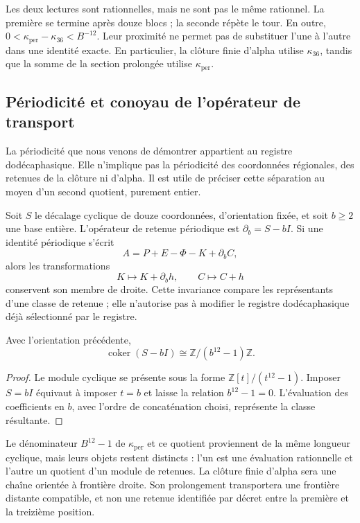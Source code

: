 Les deux lectures sont rationnelles, mais ne sont pas le même rationnel. La première se termine après douze blocs ; la seconde répète le tour. En outre, \(0<\kappa_{\mathrm{per}}-\kappa_{36}<B^{-12}\). Leur proximité ne permet pas de substituer l'une à l'autre dans une identité exacte. En particulier, la clôture finie d'alpha utilise \(\kappa_{36}\), tandis que la somme de la section prolongée utilise \(\kappa_{\mathrm{per}}\).



\subsection{Périodicité et conoyau de l'opérateur de transport}
\label{subsec:k-clase-acarreo}

La périodicité que nous venons de démontrer appartient au registre dodécaphasique. Elle n'implique
pas la périodicité des coordonnées régionales, des retenues de la clôture
ni d'alpha. Il est utile de préciser cette séparation au moyen d'un second
quotient, purement entier.

Soit \(S\) le décalage cyclique de douze coordonnées, d'orientation fixée, et soit \(b\geq2\) une base entière. L'opérateur de retenue périodique est \(\partial_b=S-bI\). Si une identité périodique s'écrit
\[
 A=P+E-\Phi-K+\partial_bC,
\]
alors les transformations
\[
 K\longmapsto K+\partial_bh,\qquad C\longmapsto C+h
\]
conservent son membre de droite. Cette invariance compare les représentants d'une
classe de retenue ; elle n'autorise pas à modifier le registre dodécaphasique déjà
sélectionné par le registre.

\begin{proposition}
\label{prop:k-cociente-acarreo}
Avec l'orientation précédente,
\[
 \operatorname{coker}(S-bI)\cong\mathbb Z/(b^{12}-1)\mathbb Z.
\]
\end{proposition}

\begin{proof}
Le module cyclique se présente sous la forme
\(\mathbb Z[t]/(t^{12}-1)\). Imposer \(S=bI\) équivaut à imposer
\(t=b\) et laisse la relation \(b^{12}-1=0\). L'évaluation des
coefficients en \(b\), avec l'ordre de concaténation choisi, représente
la classe résultante.
\end{proof}

Le dénominateur \(B^{12}-1\) de \(\kappa_{\mathrm{per}}\) et ce quotient proviennent de la même longueur cyclique, mais leurs objets restent distincts : l'un est une évaluation rationnelle et l'autre un quotient d'un module de retenues. La clôture finie d'alpha sera une chaîne orientée à frontière droite. Son prolongement transportera une frontière distante compatible, et non une retenue identifiée par décret entre la première et la treizième position.

